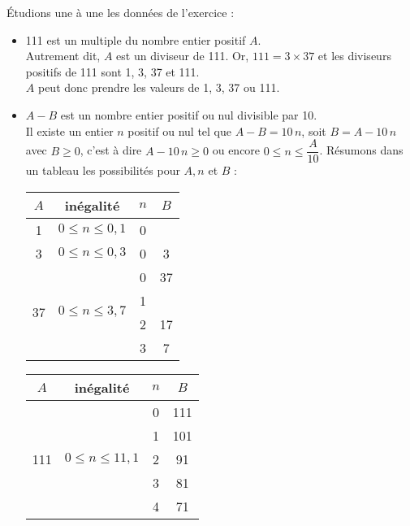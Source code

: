    Étudions une à une les données de l'exercice :
   \begin{itemize}
      \item 111 est un multiple du nombre entier positif $A$. \\
         Autrement dit, $A$ est un diviseur de 111. Or, $111 =3\times37$ et les diviseurs positifs de 111 sont 1, 3, 37 et 111. \\
         $A$ peut donc prendre les valeurs de 1, 3, 37 ou 111.
      \item $A-B$ est un nombre entier positif ou nul divisible par 10. \\
         Il existe un entier $n$ positif ou nul tel que $A-B =10\,n$, soit $B =A-10\,n$ avec $B\geq0$, c'est à dire $A-10\,n\geq0$ ou encore $0\leqslant n\leqslant \dfrac{A}{10}$. Résumons dans un tableau les possibilités pour $A, n$ et $B$ : \\ [1mm]
         \begin{tabular}{|C{0.8}|c|C{0.8}|C{0.8}|}
            \hline
            $A$ & inégalité & $n$ & $B$ \\
             & $0\leqslant n\leqslant 0,1$ & 0 & {} \\
             & $0\leqslant n\leqslant 0,3$ & 0 & 3 \\
            \hline
             &  & 0 & 37 \\
            & & 1 & {} \\
            & & 2 & 17 \\
            & & 3 & 7 \\
            \hline
         \end{tabular}
         \qquad
         \begin{tabular}{|C{0.8}|c|C{0.8}|C{0.8}|}
            \hline
            $A$ & inégalité & $n$ & $B$ \\
            \hline
             &  & 0 & 111 \\
            & & 1 & 101 \\
            & & 2 & 91 \\
            & & 3 & 81 \\
            & & 4 & 71 \\

\end{tabular}
\end{itemize}
